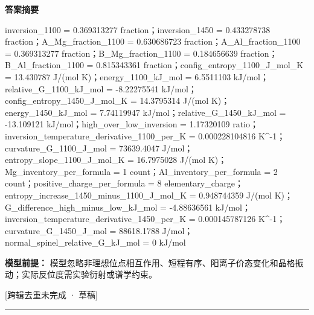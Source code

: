 \documentclass[UTF8,11pt,a4paper]{ctexart}
\begin{document}
\noindent\textbf{答案摘要}\par
inversion\_1100 = 0.369313277 fraction；inversion\_1450 = 0.433278738 fraction；A\_Mg\_fraction\_1100 = 0.630686723 fraction；A\_Al\_fraction\_1100 = 0.369313277 fraction；B\_Mg\_fraction\_1100 = 0.184656639 fraction；B\_Al\_fraction\_1100 = 0.815343361 fraction；config\_entropy\_1100\_J\_mol\_K = 13.430787 J/(mol K)；energy\_1100\_kJ\_mol = 6.5511103 kJ/mol；relative\_G\_1100\_kJ\_mol = -8.22275541 kJ/mol；config\_entropy\_1450\_J\_mol\_K = 14.3795314 J/(mol K)；energy\_1450\_kJ\_mol = 7.74119947 kJ/mol；relative\_G\_1450\_kJ\_mol = -13.109121 kJ/mol；high\_over\_low\_inversion = 1.17320109 ratio；inversion\_temperature\_derivative\_1100\_per\_K = 0.000228104816 K\textasciicircum{}-1；curvature\_G\_1100\_J\_mol = 73639.4047 J/mol；entropy\_slope\_1100\_J\_mol\_K = 16.7975028 J/(mol K)；Mg\_inventory\_per\_formula = 1 count；Al\_inventory\_per\_formula = 2 count；positive\_charge\_per\_formula = 8 elementary\_charge；entropy\_increase\_1450\_minus\_1100\_J\_mol\_K = 0.948744359 J/(mol K)；G\_difference\_high\_minus\_low\_kJ\_mol = -4.88636561 kJ/mol；inversion\_temperature\_derivative\_1450\_per\_K = 0.000145787126 K\textasciicircum{}-1；curvature\_G\_1450\_J\_mol = 88618.1788 J/mol；normal\_spinel\_relative\_G\_kJ\_mol = 0 kJ/mol\par
\noindent\textbf{模型前提：}
模型忽略非理想位点相互作用、短程有序、阳离子价态变化和晶格振动；实际反位度需实验衍射或谱学约束。\par
\noindent\textcolor{red!65!black}{[跨辑去重未完成 · 草稿]} \par
\medskip\hrule\medskip
{}
\end{document}

